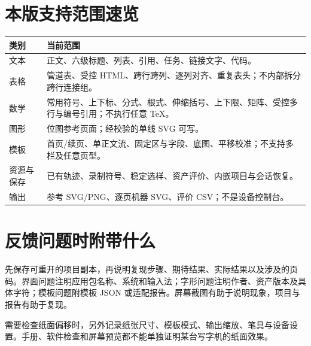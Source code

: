 \section{本版支持范围速览}
\par\noindent\begin{tabularx}{\linewidth}{@{}P{34mm}Y@{}}
\toprule
类别 & 当前范围\\\midrule
文本 & 正文、六级标题、列表、引用、任务、链接文字、代码。\\
表格 & 管道表、受控 HTML、跨行跨列、逐列对齐、重复表头；不内部拆分跨行连接组。\\
数学 & 常用符号、上下标、分式、根式、伸缩括号、上下限、矩阵、受控多行与编号引用；不执行任意 TeX。\\
图形 & 位图参考页面；经校验的单线 SVG 可写。\\
模板 & 首页/续页、单正文流、固定区与字段、底图、平移校准；不支持多栏及任意页型。\\
资源与保存 & 已有轨迹、录制符号、稳定选样、资产评价、内嵌项目与会话恢复。\\
输出 & 参考 SVG/PNG、逐页机器 SVG、评价 CSV；不是设备控制台。\\
\bottomrule
\end{tabularx}

\section{反馈问题时附带什么}
先保存可重开的项目副本，再说明复现步骤、期待结果、实际结果以及涉及的页码。界面问题注明应用包名称、系统和输入法；字形问题注明作者、资产版本及具体字符；模板问题附模板 JSON 或适配报告。屏幕截图有助于说明现象，项目与报告有助于复现。

需要检查纸面偏移时，另外记录纸张尺寸、模板模式、输出缩放、笔具与设备设置。手册、软件检查和屏幕预览都不能单独证明某台写字机的纸面效果。

